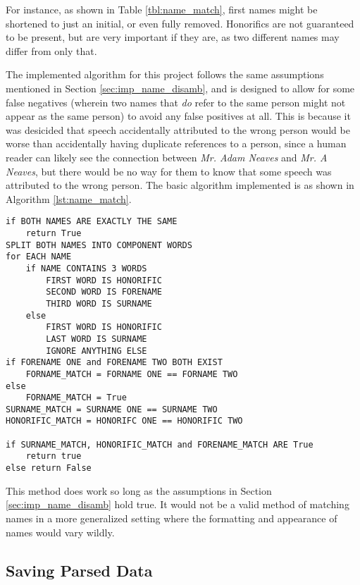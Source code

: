 For instance, as shown in Table \ref{tbl:name_match}, first names might be shortened to just an initial, or even fully removed. Honorifics are not guaranteed to be present, but are very important if they are, as two different names may differ from only that.

The implemented algorithm for this project follows the same assumptions mentioned in Section \ref{sec:imp_name_disamb}, and is designed to allow for some false negatives (wherein two names that \emph{do} refer to the same person might not appear as the same person) to avoid any false positives at all. This is because it was desicided that speech accidentally attributed to the wrong person would be worse than accidentally having duplicate references to a person, since a human reader can likely see the connection between \emph{Mr. Adam Neaves} and \emph{Mr. A Neaves}, but there would be no way for them to know that some speech was attributed to the wrong person. The basic algorithm implemented is as shown in Algorithm \ref{lst:name_match}.
\begin{lstlisting}[float=ht,
				   caption={Pseudocode representing the name matching method},
				   label={lst:name_match}]
if BOTH NAMES ARE EXACTLY THE SAME
	return True
SPLIT BOTH NAMES INTO COMPONENT WORDS
for EACH NAME
	if NAME CONTAINS 3 WORDS
		FIRST WORD IS HONORIFIC
		SECOND WORD IS FORENAME
		THIRD WORD IS SURNAME
	else
		FIRST WORD IS HONORIFIC
		LAST WORD IS SURNAME
		IGNORE ANYTHING ELSE
if FORENAME ONE and FORENAME TWO BOTH EXIST
	FORNAME_MATCH = FORNAME ONE == FORNAME TWO
else
	FORNAME_MATCH = True
SURNAME_MATCH = SURNAME ONE == SURNAME TWO
HONORIFIC_MATCH = HONORIFC ONE == HONORIFIC TWO

if SURNAME_MATCH, HONORIFIC_MATCH and FORENAME_MATCH ARE True
	return true
else return False
\end{lstlisting}

This method does work so long as the assumptions in Section \ref{sec:imp_name_disamb} hold true. It would not be a valid method of matching names in a more generalized setting where the formatting and appearance of names would vary wildly.

\subsection{Saving Parsed Data}
\label{sec:imp_saving_pased_data}

